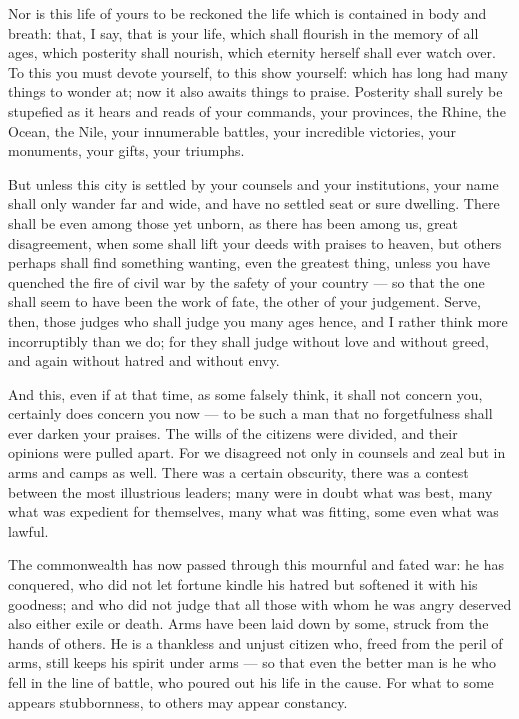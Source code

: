  Nor is this life of yours to be reckoned the life which is contained in body and breath: that, I say, that is your life, which shall flourish in the memory of all ages, which posterity shall nourish, which eternity herself shall ever watch over. To this you must devote yourself, to this show yourself: which has long had many things to wonder at; now it also awaits things to praise. Posterity shall surely be stupefied as it hears and reads of your commands, your provinces, the Rhine, the Ocean, the Nile, your innumerable battles, your incredible victories, your monuments, your gifts, your triumphs.

 But unless this city is settled by your counsels and your institutions, your name shall only wander far and wide, and have no settled seat or sure dwelling. There shall be even among those yet unborn, as there has been among us, great disagreement, when some shall lift your deeds with praises to heaven, but others perhaps shall find something wanting, even the greatest thing, unless you have quenched the fire of civil war by the safety of your country --- so that the one shall seem to have been the work of fate, the other of your judgement. Serve, then, those judges who shall judge you many ages hence, and I rather think more incorruptibly than we do; for they shall judge without love and without greed, and again without hatred and without envy.

 And this, even if at that time, as some falsely think, it shall not concern you, certainly does concern you now --- to be such a man that no forgetfulness shall ever darken your praises. The wills of the citizens were divided, and their opinions were pulled apart. For we disagreed not only in counsels and zeal but in arms and camps as well. There was a certain obscurity, there was a contest between the most illustrious leaders; many were in doubt what was best, many what was expedient for themselves, many what was fitting, some even what was lawful.

 The commonwealth has now passed through this mournful and fated war: he has conquered, who did not let fortune kindle his hatred but softened it with his goodness; and who did not judge that all those with whom he was angry deserved also either exile or death. Arms have been laid down by some, struck from the hands of others. He is a thankless and unjust citizen who, freed from the peril of arms, still keeps his spirit under arms --- so that even the better man is he who fell in the line of battle, who poured out his life in the cause. For what to some appears stubbornness, to others may appear constancy.

